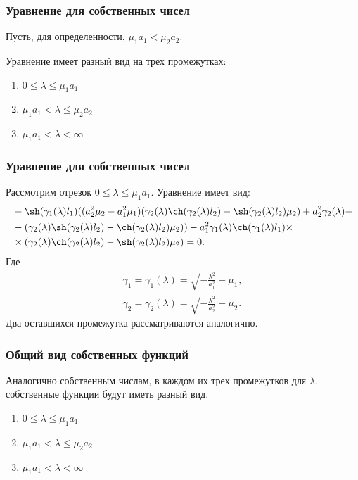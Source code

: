 \documentclass[10pt,pdf,hyperref={unicode}]{beamer}
\begin{document}
\begin{frame}
  \frametitle{Уравнение для собственных чисел}
  Пусть, для определенности, $\mu_1 a_1 < \mu_2 a_2$.

  Уравнение имеет разный вид на трех промежутках:
  \begin{enumerate}
    \item $ 0 \le \lambda \le \mu_1a_1$
    \item $ \mu_1a_1 < \lambda \le \mu_2a_2 $
    \item $\mu_1a_1 < \lambda < \infty$
  \end{enumerate}
\end{frame}
\begin{frame}
  \frametitle{Уравнение для собственных чисел}
  Рассмотрим отрезок $ 0 \le \lambda \le \mu_1a_1$. Уравнение имеет вид: 
  \begin{equation*}
    \begin{aligned}
    & -\sh(\gamma_1(\lambda) l_1) ((a_2^2 \mu_2-a_1^2 \mu_1) (\gamma_2(\lambda) \ch(\gamma_2(\lambda) l_2)-\sh(\gamma_2(\lambda) l_2) \mu_2)+a_2^2 \gamma_2(\lambda)- \\
    & -(\gamma_2(\lambda) \sh(\gamma_2(\lambda) l_2)-\ch(\gamma_2(\lambda) l_2) \mu_2))-a_1^2 \gamma_1(\lambda) \ch(\gamma_1(\lambda) l_1) \times \\
    & \times (\gamma_2(\lambda) \ch(\gamma_2(\lambda) l_2)-\sh(\gamma_2(\lambda) l_2) \mu_2) = 0.
    \end{aligned}
  \end{equation*}
  Где
  \begin{equation*}
    \begin{aligned}
      \gamma_1 = \gamma_1(\lambda) = \sqrt{- \frac{\lambda^2}{a_1^2} + \mu_1}, \\
      \gamma_2 = \gamma_2(\lambda) = \sqrt{- \frac{\lambda^2}{a_2^2} + \mu_2}.
    \end{aligned}
  \end{equation*}
  Два оставшихся промежутка рассматриваются аналогично.
\end{frame}

\begin{frame}
  \frametitle{Общий вид собственных функций}
  Аналогично собственным числам, в каждом их трех промежутков для $\lambda$, собственные функции будут иметь разный вид.
  \begin{enumerate}
    \item $ 0 \le \lambda \le \mu_1a_1$
    \item $ \mu_1a_1 < \lambda \le \mu_2a_2 $
    \item $\mu_1a_1 < \lambda < \infty$
  \end{enumerate}
\end{frame}
\end{document}
